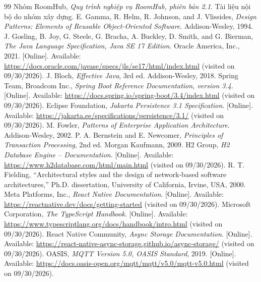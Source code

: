 \begin{thebibliography}{99}
 Nhóm RoomHub, \textit{Quy trình nghiệp vụ RoomHub, phiên bản 2.1}. Tài liệu nội bộ do nhóm xây dựng.
 E. Gamma, R. Helm, R. Johnson, and J. Vlissides, \textit{Design Patterns: Elements of Reusable Object-Oriented Software}. Addison-Wesley, 1994.
 J. Gosling, B. Joy, G. Steele, G. Bracha, A. Buckley, D. Smith, and G. Bierman, \textit{The Java Language Specification, Java SE 17 Edition}. Oracle America, Inc., 2021. [Online]. Available: \url{https://docs.oracle.com/javase/specs/jls/se17/html/index.html} (visited on 09/30/2026).
 J. Bloch, \textit{Effective Java}, 3rd ed. Addison-Wesley, 2018.
 Spring Team, Broadcom Inc., \textit{Spring Boot Reference Documentation, version 3.4}. [Online]. Available: \url{https://docs.spring.io/spring-boot/3.4/index.html} (visited on 09/30/2026).
 Eclipse Foundation, \textit{Jakarta Persistence 3.1 Specification}. [Online]. Available: \url{https://jakarta.ee/specifications/persistence/3.1/} (visited on 09/30/2026).
 M. Fowler, \textit{Patterns of Enterprise Application Architecture}. Addison-Wesley, 2002.
 P. A. Bernstein and E. Newcomer, \textit{Principles of Transaction Processing}, 2nd ed. Morgan Kaufmann, 2009.
 H2 Group, \textit{H2 Database Engine -- Documentation}. [Online]. Available: \url{https://www.h2database.com/html/main.html} (visited on 09/30/2026).
 R. T. Fielding, ``Architectural styles and the design of network-based software architectures,'' Ph.D. dissertation, University of California, Irvine, USA, 2000.
 Meta Platforms, Inc., \textit{React Native Documentation}. [Online]. Available: \url{https://reactnative.dev/docs/getting-started} (visited on 09/30/2026).
 Microsoft Corporation, \textit{The TypeScript Handbook}. [Online]. Available: \url{https://www.typescriptlang.org/docs/handbook/intro.html} (visited on 09/30/2026).
 React Native Community, \textit{Async Storage Documentation}. [Online]. Available: \url{https://react-native-async-storage.github.io/async-storage/} (visited on 09/30/2026).
 OASIS, \textit{MQTT Version 5.0, OASIS Standard}, 2019. [Online]. Available: \url{https://docs.oasis-open.org/mqtt/mqtt/v5.0/mqtt-v5.0.html} (visited on 09/30/2026).

\end{thebibliography}
